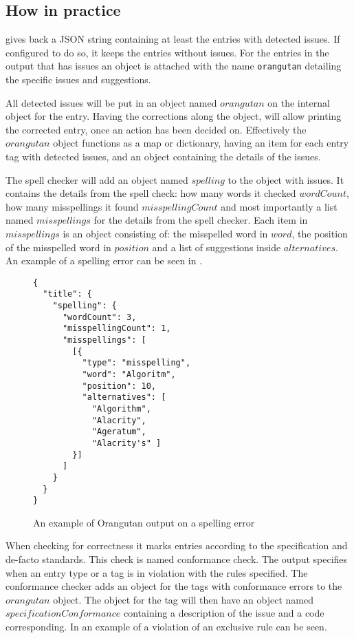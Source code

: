 \subsection{How in practice}
\label{sec:organizing_orangutan_how_practice}

{\orangutan} gives back a JSON string containing at least the entries
with detected issues.  If configured to do so, it keeps the entries
without issues.  For the entries in the output that has issues an
object is attached with the name \texttt{orangutan} detailing the
specific issues and suggestions.

All detected issues will be put in an object named $orangutan$ on the
internal object for the entry.  Having the corrections along the
object, will allow printing the corrected entry, once an action has
been decided on.  Effectively the $orangutan$ object functions as a
map or dictionary, having an item for each entry tag with detected
issues, and an object containing the details of the issues.

The spell checker will add an object named $spelling$ to the object
with issues.  It contains the details from the spell check: how many
words it checked $wordCount$, how many misspellings it found
$misspellingCount$ and most importantly a list named $misspellings$
for the details from the spell checker.  Each item in $misspellings$
is an object consisting of: the misspelled word in $word$, the
position of the misspelled word in $position$ and a list of
suggestions inside $alternatives$.  An example of a spelling error can
be seen in .

\begin{figure}
  \centering
\begin{verbatim}
{
  "title": {
    "spelling": {
      "wordCount": 3,
      "misspellingCount": 1,
      "misspellings": [
        [{
          "type": "misspelling",
          "word": "Algoritm",
          "position": 10,
          "alternatives": [
            "Algorithm",
            "Alacrity",
            "Ageratum",
            "Alacrity's" ]
        }]
      ]
    }
  }
}
\end{verbatim}
\caption{An example of Orangutan output on a spelling error}
\label{fig:orgazing_misspelling_output}
\end{figure}


When checking for correctness it marks entries according to the
{\bibtex} specification and de-facto standards.  This check is named
conformance check.  The output specifies when an entry type or a tag
is in violation with the rules specified.  The conformance checker
adds an object for the tags with conformance errors to the $orangutan$
object.  The object for the tag will then have an object named
$specificationConformance$ containing a description of the issue and a
code corresponding.  In  an example
of a violation of an exclusive rule can be seen.

